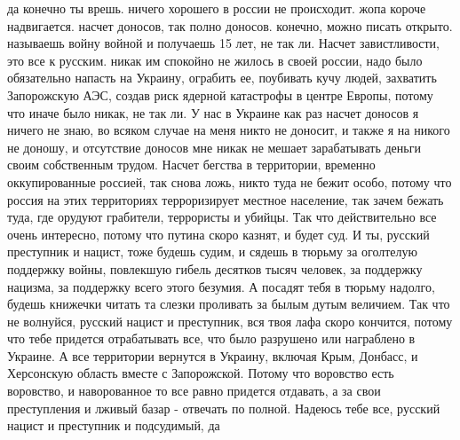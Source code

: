  
 
 
 
 

да конечно ты врешь. ничего хорошего в россии не происходит. жопа короче
надвигается. насчет доносов, так полно доносов. конечно, можно писать открыто.
называешь войну войной и получаешь 15 лет, не так ли. Насчет завистливости, это
все к русским. никак им спокойно не жилось в своей россии, надо было
обязательно напасть на Украину, ограбить ее, поубивать кучу людей, захватить
Запорожскую АЭС, создав риск ядерной катастрофы в центре Европы, потому что
иначе было никак, не так ли. У нас в Украине как раз насчет доносов я ничего не
знаю, во всяком случае на меня никто не доносит, и также я на никого не доношу,
и отсутствие доносов мне никак не мешает зарабатывать деньги своим собственным
трудом. Насчет бегства в территории, временно оккупированные россией, так снова
ложь, никто туда не бежит особо, потому что россия на этих территориях
терроризирует местное население, так зачем бежать туда, где орудуют грабители,
террористы и убийцы. Так что действительно все очень интересно, потому что
путина скоро казнят, и будет суд. И ты, русский преступник и нацист, тоже
будешь судим, и сядешь в тюрьму за оголтелую поддержку войны, повлекшую гибель
десятков тысяч человек, за поддержку нацизма, за поддержку всего этого безумия.
А посадят тебя в тюрьму надолго, будешь книжечки читать та слезки проливать за
былым дутым величием. Так что не волнуйся, русский нацист и преступник, вся
твоя лафа скоро кончится, потому что тебе придется отрабатывать все, что было
разрушено или награблено в Украине. А все территории вернутся в Украину,
включая Крым, Донбасс, и Херсонскую область вместе с Запорожской. Потому что
воровство есть воровство, и наворованное то все равно придется отдавать, а за
свои преступления и лживый базар - отвечать по полной. Надеюсь тебе все,
русский нацист и преступник и подсудимый, да
